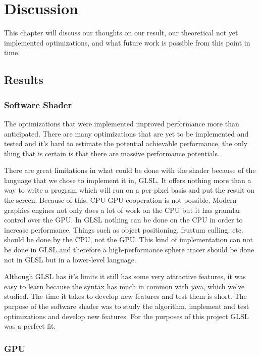 \chapter{Discussion} 

	This chapter will discuss our thoughts on our result, our theoretical not
	yet	implemented optimizations, and what future work is possible from this
	point in time.
	
	\section{Results} \label{discussion}
		
		\subsection{Software Shader}

			The optimizations that were implemented improved performance more
			than anticipated. There are many optimizations that are yet to be
			implemented and tested and it's hard to estimate the potential
			achievable performance, the only thing that is certain is that
			there are massive performance potentials.

			There are great limitations in what could be done with the shader
			because of the language that we chose to implement it in, GLSL. It
			offers nothing more than a way to write a program which will run on
			a per-pixel basis and put the result on the screen. Because of
			this, CPU-GPU cooperation is not possible. Modern graphics engines 
			not only does a lot of work on the CPU but it has granular control 
			over the GPU. In GLSL nothing can be done on the CPU in order to 
			increase performance. Things such as object positioning, frustum 
			culling, etc. should be done by the CPU, not the GPU. This kind of 
			implementation can not be done in GLSL and therefore a 
			high-performance sphere tracer should be done not in GLSL but in a 
			lower-level language.

			Although GLSL has it's limits it still has some very attractive
			features, it was easy to learn because the syntax has much in
			common with java, which we've studied. The time it takes to develop
			new features and test them is short. The purpose of the software
			shader was to study the algorithm, implement and test optimizations
			and develop new features. For the purposes of this project GLSL was 
			a perfect fit.
		
		\subsection{GPU} 
		
